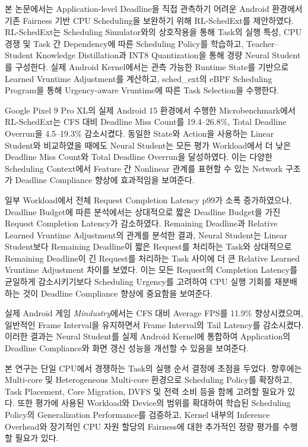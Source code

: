 본 논문에서는 Application-level Deadline을 직접 관측하기 어려운 Android 환경에서 기존 Fairness 기반 CPU Scheduling을 보완하기 위해 RL-SchedExt를 제안하였다.
RL-SchedExt는 Scheduling Simulator와의 상호작용을 통해 Task의 실행 특성, CPU 경쟁 및 Task 간 Dependency에 따른 Scheduling Policy를 학습하고, Teacher--Student Knowledge Distillation과 INT8 Quantization을 통해 경량 Neural Student를 구성한다.
실제 Android Kernel에서는 관측 가능한 Runtime State를 기반으로 Learned Vruntime Adjustment를 계산하고, sched\_ext의 eBPF Scheduling Program을 통해 Urgency-aware Vruntime에 따른 Task Selection을 수행한다.

Google Pixel 9 Pro XL의 실제 Android 15 환경에서 수행한 Microbenchmark에서 RL-SchedExt는 CFS 대비 Deadline Miss Count를 19.4--26.8\%, Total Deadline Overrun을 4.5--19.3\% 감소시켰다.
동일한 State와 Action을 사용하는 Linear Student와 비교하였을 때에도 Neural Student는 모든 평가 Workload에서 더 낮은 Deadline Miss Count와 Total Deadline Overrun을 달성하였다.
이는 다양한 Scheduling Context에서 Feature 간 Nonlinear 관계를 표현할 수 있는 Network 구조가 Deadline Compliance 향상에 효과적임을 보여준다.

일부 Workload에서 전체 Request Completion Latency p99가 소폭 증가하였으나, Deadline Budget에 따른 분석에서는 상대적으로 짧은 Deadline Budget을 가진 Request Completion Latency가 감소하였다.
Remaining Deadline과 Relative Learned Vruntime Adjustment의 관계를 분석한 결과, Neural Student는 Linear Student보다 Remaining Deadline이 짧은 Request를 처리하는 Task와 상대적으로 Remaining Deadline이 긴 Request를 처리하는 Task 사이에 더 큰 Relative Learned Vruntime Adjustment 차이를 보였다.
이는 모든 Request의 Completion Latency를 균일하게 감소시키기보다 Scheduling Urgency를 고려하여 CPU 실행 기회를 재분배하는 것이 Deadline Compliance 향상에 중요함을 보여준다.

실제 Android 게임 \textit{Mindustry}에서는 CFS 대비 Average FPS를 11.9\% 향상시켰으며, 일반적인 Frame Interval을 유지하면서 Frame Interval의 Tail Latency를 감소시켰다.
이러한 결과는 Neural Student를 실제 Android Kernel에 통합하여 Application의 Deadline Compliance와 화면 갱신 성능을 개선할 수 있음을 보여준다.

본 연구는 단일 CPU에서 경쟁하는 Task의 실행 순서 결정에 초점을 두었다.
향후에는 Multi-core 및 Heterogeneous Multi-core 환경으로 Scheduling Policy를 확장하고, Task Placement, Core Migration, DVFS 및 전력 소비 등을 함께 고려할 필요가 있다.
또한 평가에 사용된 Workload와 Device의 범위를 확대하여 학습된 Scheduling Policy의 Generalization Performance를 검증하고, Kernel 내부의 Inference Overhead와 장기적인 CPU 자원 할당의 Fairness에 대한 추가적인 정량 평가를 수행할 필요가 있다.

